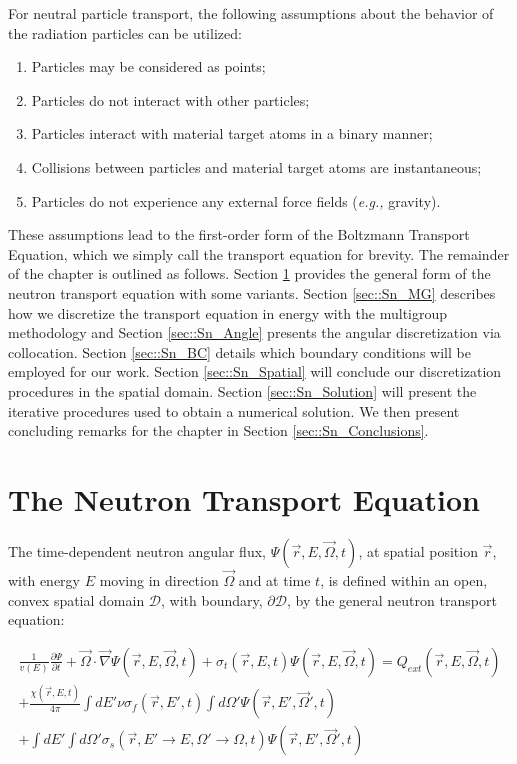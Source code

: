 For neutral particle transport, the following assumptions \cite{duderstadt1979transport} about the behavior of the radiation particles can be utilized:

\begin{enumerate}
	\item Particles may be considered as points;
	\item Particles do not interact with other particles;
	\item Particles interact with material target atoms in a binary manner;
	\item Collisions between particles and material target atoms are instantaneous;
	\item Particles do not experience any external force fields ({\em e.g.,} gravity).
\end{enumerate}

These assumptions lead to the first-order form of the Boltzmann Transport Equation, which we simply call the transport equation for brevity. The remainder of the chapter is outlined as follows. Section \ref{sec::Sn_neut} provides the general form of the neutron transport equation with some variants. Section \ref{sec::Sn_MG} describes how we discretize the transport equation in energy with the multigroup methodology and Section \ref{sec::Sn_Angle} presents the angular discretization via collocation. Section \ref{sec::Sn_BC} details which boundary conditions will be employed for our work. Section \ref{sec::Sn_Spatial} will conclude our discretization procedures in the spatial domain. Section \ref{sec::Sn_Solution} will present the iterative procedures used to obtain a numerical solution. We then present concluding remarks for the chapter in Section \ref{sec::Sn_Conclusions}.

\section{The Neutron Transport Equation}
\label{sec::Sn_neut}

The time-dependent neutron angular flux, $\Psi (\vec{r}, E, \vec{\Omega}, t)$, at spatial position $\vec{r}$, with energy $E$ moving in direction $\vec{\Omega}$ and at time $t$, is defined within an open, convex spatial domain $\mathcal{D}$, with boundary, $\partial \mathcal{D}$, by the general neutron transport equation:


\begin{equation}
\label{eq::Sn_transport_eq_full}
\begin{aligned}
\frac{1}{v(E)}\frac{\partial \Psi}{\partial t} + \vec{\Omega} \cdot \vec{\nabla} \Psi (\vec{r}, E, \vec{\Omega},t)+ \sigma_t (\vec{r}, E,t) \Psi (\vec{r}, E, \vec{\Omega},t) =Q_{ext} (\vec{r}, E, \vec{\Omega},t) \\
+ \frac{\chi (\vec{r}, E,t)}{4 \pi} \int dE' \nu \sigma_f (\vec{r}, E',t) \int d\Omega' \Psi (\vec{r}, E', \vec{\Omega}',t) \\ 
+ \int dE' \int d\Omega' \sigma_s (\vec{r},E' \rightarrow E, \Omega' \rightarrow \Omega,t) \Psi (\vec{r}, E', \vec{\Omega}',t)
\end{aligned}
\end{equation}

